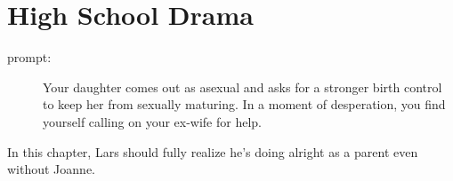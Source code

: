 \section*{High School Drama}

\begin{description}
\item[prompt:] Your daughter comes out as asexual and asks for a stronger birth control to keep her from sexually maturing. In a moment of desperation, you find yourself calling on your ex-wife for help.
\end{description}

In this chapter, Lars should fully realize he's doing alright as a parent even without Joanne.

